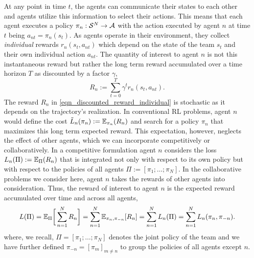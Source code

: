 \documentclass{article}
\begin{document}
At any point in time $t$, the agents can communicate their states to each other and agents utilize this information to select their actions. This means that each agent executes a policy $\pi_n:{\mathcal S}^N\to{\ensuremath{\mathcal A}}$ with the action executed by agent $n$ at time $t$ being $a_{nt} = \pi_{n}(s_t)$. As agents operate in their environment, they collect {\it individual} rewards $r_n(s_t, a_{nt})$ which depend on the state of the team $s_t$ and their own individual action $a_{nt}$. The quantity of interest to agent $n$ is not this instantaneous reward but rather the long term reward accumulated over a time horizon $T$ as discounted by a factor $\gamma$,
%
\begin{equation}\label{eqn_discounted_reward_individual}
   R_n := \sum_{t=0}^{T} \gamma^t r_n(s_t, a_{nt}).
\end{equation}
%
The reward $R_n$ in \eqref{eqn_discounted_reward_individual} is stochastic as it depends on the trajectory's realization. In conventional RL problems, agent $n$ would define the cost ${\tilde L}_n(\pi_n) :={\mathbb E}_{\pi_n}(R_n)$ and search for a policy $\pi_n$ that maximizes this long term expected reward. This expectation, however, neglects the effect of other agents, which we can incorporate competitively or collaboratively. In a competitive formulation agent $n$ considers the loss $L_n(\Pi) :={\mathbb E}_{\Pi}(R_n)$ that is integrated not only with respect to its own policy but with respect to the policies of all agents $\Pi := [\pi_1;\ldots;\pi_N]$. In the collaborative problems we consider here, agent $n$ takes the rewards of other agents into consideration. Thus, the reward of interest to agent $n$ is the expected reward accumulated over time and across all agents,
%
\begin{equation}\label{eqn_joint_reward}
   L(\Pi) =  {\mathbb E}_{\Pi}  \bigg[\sum_{n=1}^N R_n \bigg] 
          =  \sum_{n=1}^N {\mathbb E}_{\pi_n, \pi_{-n}} [R_n]  
          =  \sum_{n=1}^N L_n(\Pi)
          = \sum_{n=1}^N L_n(\pi_n, \pi_{-n}) .
\end{equation}
%
where, we recall, $\Pi = [\pi_1;\ldots;\pi_N]$ denotes the joint policy of the team and we have further defined $\pi_{-n} = [\pi_m]_{m\neq n}$ to group the policies of all agents except $n$.
\end{document}
